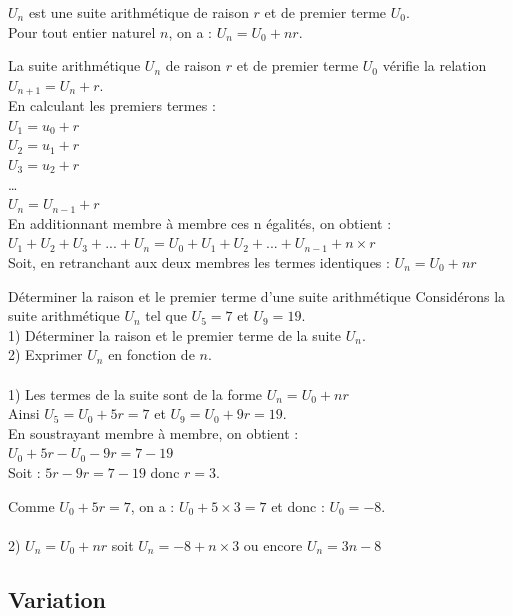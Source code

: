 \begin{propriete}
    $U_n$ est une suite arithmétique de raison $r$ et de premier terme $U_0$.\\
    Pour tout entier naturel $n$, on a : $U_n=U_0+nr$.
\end{propriete}

\begin{demonstration}
    La suite arithmétique $U_n$ de raison $r$ et de premier terme $U_0$ vérifie la relation $U_{n+1}=U_n+r$.\\
    En calculant les premiers termes :\\
    $U_1=u_0+r$\\ 
    $U_2=u_1+r$\\
    $U_3=u_2+r$\\
    …\\
    $U_n=U_{n-1}+r$\\
    
    En additionnant membre à membre ces n égalités, on obtient :\\
    $U_1+U_2+U_3+...+U_n=U_0+U_1+U_2+...+U_{n-1}+n\times r$\\
    Soit, en retranchant aux deux membres les termes identiques :
    $U_n=U_0+nr$
\end{demonstration}

\begin{methodeTitre}{Déterminer la raison et le premier terme d'une suite arithmétique}
    Considérons la suite arithmétique $U_n$ tel que $U_5=7$ et $U_9=19$.\\
    1) Déterminer la raison et le premier terme de la suite $U_n$.\\
    2) Exprimer $U_n$ en fonction de $n$.\\ 
    \\
    1) Les termes de la suite sont de la forme $U_n=U_0+nr$\\
    Ainsi 	$U_5=U_0+5r=7$  et $U_9=U_0+9r=19$.\\
    En soustrayant membre à membre, on obtient :\\ $U_0+5r-U_0-9r=7-19$\\
    Soit : $5r-9r=7-19$ donc $r=3$.
    
    Comme $U_0+5r=7$, on a : $U_0+5\times 3=7$ et donc : $U_0=-8$.\\
    \\
    2) $U_n=U_0+nr$  soit  $U_n=-8+n\times 3$ ou encore $U_n=3n-8$
\end{methodeTitre}

\subsection{Variation}

